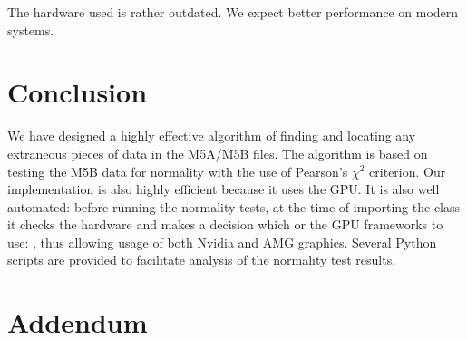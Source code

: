 \documentclass[letterpaper,twoside,12pt]{article}
\begin{document}
The hardware used is rather outdated. We expect better performance on modern systems. 
 

\section{Conclusion}

We have designed a highly effective algorithm of finding and locating any extraneous pieces of data in the M5A/M5B files. The algorithm is based on testing the M5B data for normality with the use of Pearson's $\chi^2$ criterion. Our implementation is also highly efficient because it uses the GPU. It is also well automated: before running the normality tests, at the time of importing the class \verb@Normtest@ it checks the hardware and makes a decision which or the GPU frameworks to use: \verb@CUDA@ \verb@OpenCL@, thus allowing usage of both Nvidia and AMG graphics. Several Python scripts are provided to facilitate analysis of the normality test results.


\pagebreak

\section*{Addendum}
\end{document}

